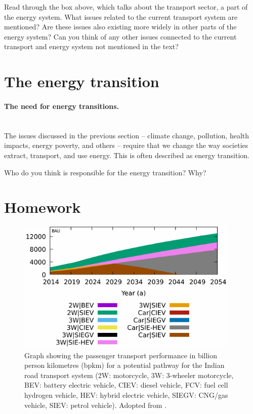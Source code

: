 \begin{kaobox}[frametitle=Task]
Read through the box above, which talks about the transport sector, a part of the energy system. What issues related to the current transport system are mentioned? Are these issues also existing more widely in other parts of the energy system? Can you think of any other issues connected to the current transport and energy system not mentioned in the text?
\end{kaobox}

\section{The energy transition}

\paragraph*{The need for energy transitions.}~\\


The issues discussed in the previous section -- climate change, pollution, health impacts, energy poverty, and others -- require that we change the way societies extract, transport, and use energy. This is often described as energy transition.

\begin{kaobox}[frametitle=Task]
Who do you think is responsible for the energy transition? Why?
\end{kaobox}


\section{Homework}

\begin{figure}[hb]
	\includegraphics[width=0.95\textwidth]{files/india_transport.pdf}
	\caption[Transport sector pathway for India.]{Graph showing the passenger transport performance in billion person kilometres (bpkm) for a potential pathway for the Indian road transport system (2W: motorcycle, 3W: 3-wheeler motorcycle, BEV: battery electric vehicle, CIEV: diesel vehicle, FCV: fuel cell hydrogen vehicle, HEV: hybrid electric vehicle, SIEGV: CNG/gas vehicle, SIEV: petrol vehicle). Adopted from \cite{hofbauer_shaping_2018}.}
\end{figure}


